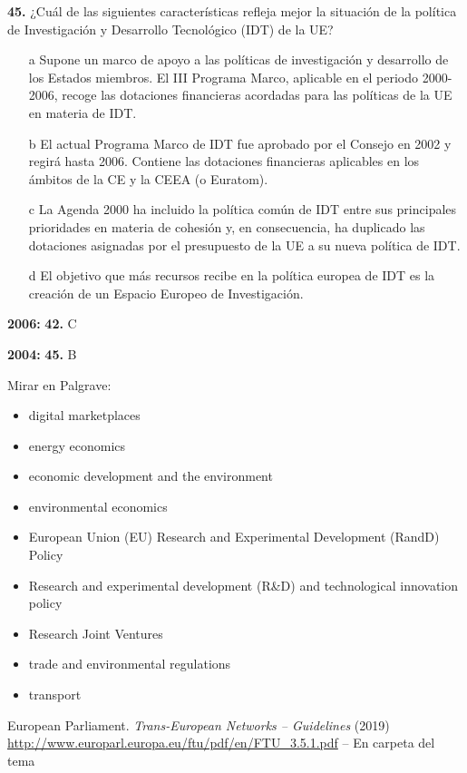 \documentclass{nuevotema}
\begin{document}
\textbf{45.} ¿Cuál de las siguientes características refleja mejor la situación de la política de Investigación y Desarrollo Tecnológico (IDT) de la UE?

\begin{itemize}
	\item[a] Supone un marco de apoyo a las políticas de investigación y desarrollo de los Estados miembros. El III Programa Marco, aplicable en el periodo 2000-2006, recoge las dotaciones financieras acordadas para las políticas de la UE en materia de IDT.
	\item[b] El actual Programa Marco de IDT fue aprobado por el Consejo en 2002 y regirá hasta 2006. Contiene las dotaciones financieras aplicables en los ámbitos de la CE y la CEEA (o Euratom).
	\item[c] La Agenda 2000 ha incluido la política común de IDT entre sus principales prioridades en materia de cohesión y, en consecuencia, ha duplicado las dotaciones asignadas por el presupuesto de la UE a su nueva política de IDT.
	\item[d] El objetivo que más recursos recibe en la política europea de IDT es la creación de un Espacio Europeo de Investigación.
\end{itemize}

\notas

\textbf{2006:} \textbf{42.} C

\textbf{2004:} \textbf{45.} B

\bibliografia

Mirar en Palgrave:
\begin{itemize}
	\item digital marketplaces
	\item energy economics
	\item economic development and the environment
	\item environmental economics
	\item European Union (EU) Research and Experimental Development (RandD) Policy
	\item Research and experimental development (R\&D) and technological innovation policy
	\item Research Joint Ventures
	\item trade and environmental regulations
	
	\item transport
\end{itemize}

European Parliament. \textit{Trans-European Networks -- Guidelines} (2019) \url{http://www.europarl.europa.eu/ftu/pdf/en/FTU_3.5.1.pdf} -- En carpeta del tema
\end{document}
